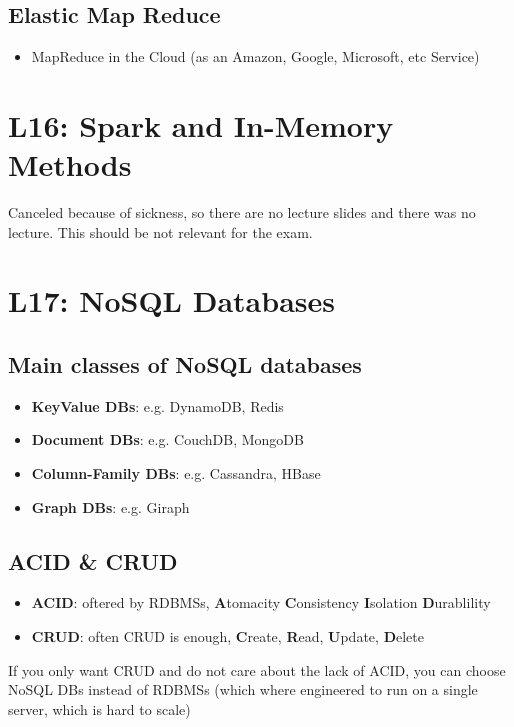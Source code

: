 \documentclass[a4paper]{article}
\begin{document}
\begin{multicols}{3}
\subsection{Elastic Map Reduce}
\begin{itemize}
    \item MapReduce in the Cloud (as an Amazon, Google, Microsoft, etc Service) 
\end{itemize}

\section{L16: Spark and In-Memory Methods}
Canceled because of sickness, so there are no lecture slides and there was no lecture. This should be not relevant for the exam.

\section{L17: NoSQL Databases}

\subsection{Main classes of NoSQL databases}
\begin{itemize}
    \item \textbf{KeyValue DBs}: e.g. DynamoDB, Redis
    \item \textbf{Document DBs}: e.g. CouchDB, MongoDB
    \item \textbf{Column-Family DBs}: e.g. Cassandra, HBase
    \item \textbf{Graph DBs}: e.g. Giraph
\end{itemize}

\subsection{ACID \& CRUD}
\begin{itemize}
    \item \textbf{ACID}: oftered by RDBMSs, \textbf{A}tomacity \textbf{C}onsistency \textbf{I}solation \textbf{D}urablility
    \item \textbf{CRUD}: often CRUD is enough, \textbf{C}reate, \textbf{R}ead, \textbf{U}pdate, \textbf{D}elete
\end{itemize}
If you only want CRUD and do not care about the lack of ACID, you can choose NoSQL DBs instead of RDBMSs (which where engineered to run on a single server, which is hard to scale)


\end{multicols}
\end{document}
